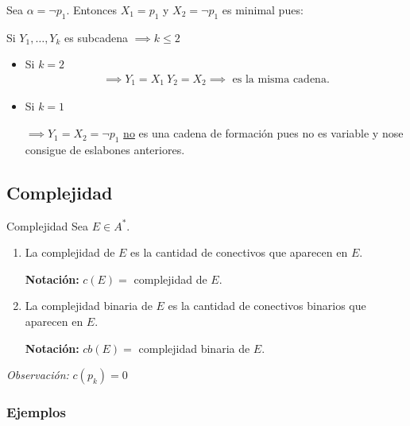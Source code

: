 Sea $\alpha = \neg p_1$. Entonces $X_1 = p_1$ y $X_2 = \neg p_1$ es minimal 
pues:

Si $Y_1, \dotsc, Y_k$ es subcadena $\implies k \leq 2$ 
%
\begin{itemize}
    \item Si $k = 2$
        \begin{gather*}
            \implies Y_1 = X_1 ~ Y_2 = X_2 
            \implies \text{ es la misma cadena.}
        \end{gather*}
    \item Si $k = 1$
        
        $\implies Y_1 = X_2 = \neg p_1$ 
        \underline{no} es una cadena de formación pues no es variable 
        y nose consigue de eslabones anteriores.
\end{itemize}



\subsection{Complejidad}

\begin{definicion}{Complejidad}{}
    Sea $E \in A^{*}$.

    \medskip

    \begin{enumerate}
        \item La complejidad de $E$ es la cantidad de conectivos que 
            aparecen en $E$.

            \bigskip
            \textbf{Notación:} \phantom{b}$c(E) =$ complejidad de $E$.
        \item La complejidad binaria de $E$ es la cantidad de conectivos
            binarios que aparecen en $E$.

            \bigskip
            \textbf{Notación:} $cb(E) =$ complejidad binaria de $E$.
    \end{enumerate}
\end{definicion}

\bigskip
\textit{Observación:}
$c(p_k) = 0$

\subsubsection{Ejemplos}

